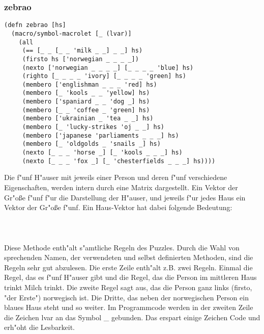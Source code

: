 \subsubsection{zebrao}

\begin{lstlisting}
(defn zebrao [hs]
  (macro/symbol-macrolet [_ (lvar)]
    (all
     (== [_ _ [_ _ 'milk _ _] _ _] hs)
     (firsto hs ['norwegian _ _ _ _])
     (nexto ['norwegian _ _ _ _] [_ _ _ _ 'blue] hs)
     (righto [_ _ _ _ 'ivory] [_ _ _ _ 'green] hs)
     (membero ['englishman _ _ _ 'red] hs)
     (membero [_ 'kools _ _ 'yellow] hs)
     (membero ['spaniard _ _ 'dog _] hs)
     (membero [_ _ 'coffee _ 'green] hs)
     (membero ['ukrainian _ 'tea _ _] hs)
     (membero [_ 'lucky-strikes 'oj _ _] hs)
     (membero ['japanese 'parliaments _ _ _] hs)
     (membero [_ 'oldgolds _ 'snails _] hs)
     (nexto [_ _ _ 'horse _] [_ 'kools _ _ _] hs)
     (nexto [_ _ _ 'fox _] [_ 'chesterfields _ _ _] hs))))
\end{lstlisting}

Die f"unf H"auser mit jeweils einer Person und deren f"unf verschiedene Eigenschaften, werden intern durch eine Matrix dargestellt. Ein Vektor der Gr"o\ss{}e f"unf f"ur die Darstellung der H"auser, und jeweils f"ur jedes Haus ein Vektor der Gr"o\ss{}e f"unf. Ein \dq{}Haus-Vektor\dq{} hat dabei folgende Bedeutung:
\\
\\
\\
\\
Diese Methode enth"alt s"amtliche Regeln des Puzzles. Durch die Wahl von sprechenden Namen, der verwendeten und selbst definierten Methoden, sind die Regeln sehr gut abzulesen. Die erste Zeile enth"alt z.B. zwei Regeln. Einmal die Regel, das es f"unf H"auser gibt und die Regel, das die Person im mittleren Haus trinkt Milch trinkt. Die zweite Regel sagt aus, das die Person ganz links (firsto, "der Erste") norwegisch ist. Die Dritte, das neben der norwegischen Person ein blaues Haus steht und so weiter.
Im Programmcode werden in der zweiten Zeile die Zeichen \dq{}lvar\dq{} an das Symbol \dq{}\_\dq{} gebunden. Das erspart einige Zeichen Code und erh"oht die Lesbarkeit.
